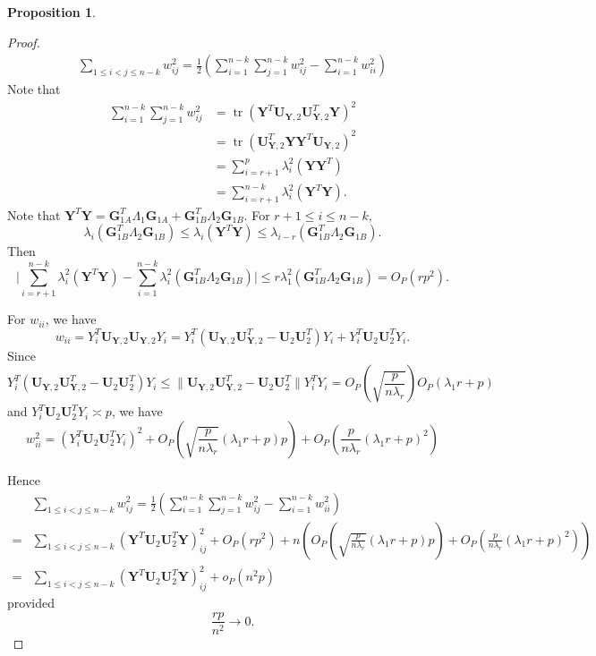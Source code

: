 \documentclass[12pt]{article} %
\DeclareMathOperator{\mytr}{tr}
\newcommand{\bY}{\mathbf{Y}}
\newcommand{\bG}{\mathbf{G}}
\newcommand{\bU}{\mathbf{U}}
\newtheorem{proposition}{Proposition}
\theoremstyle{definition}
\begin{document}
\begin{proposition}

\end{proposition}
\begin{proof}
    $$
    \begin{aligned}
    \sum_{1\leq i < j\leq n-k} w_{ij}^2=
        \frac{1}{2}(\sum_{i=1}^{n-k}\sum_{j=1}^{n-k} w_{ij}^2-\sum_{i=1}^{n-k}w_{ii}^2)
    \end{aligned}
    $$
    Note that
    $$
    \begin{aligned}
\sum_{i=1}^{n-k}\sum_{j=1}^{n-k} w_{ij}^2
        &=\mytr(\bY^T \bU_{\bY,2} \bU_{\bY,2}^T \bY)^2\\
        &=\mytr(\bU_{\bY,2}^T \bY\bY^T \bU_{\bY,2} )^2\\
        &=\sum_{i=r+1}^{p}\lambda_i^2(\bY\bY^T)\\
        &=\sum_{i=r+1}^{n-k}\lambda_i^2(\bY^T\bY).
    \end{aligned}
    $$
    Note that $\bY^T\bY=\bG_{1A}^T \Lambda_1 \bG_{1A}+\bG_{1B}^T \Lambda_2 \bG_{1B}$. For $r+1\leq i\leq n-k$,
    $$
    \lambda_i (\bG_{1B}^T \Lambda_2 \bG_{1B})\leq \lambda_i(\bY^T \bY)\leq \lambda_{i-r}(\bG_{1B}^T \Lambda_2 \bG_{1B}).
    $$
    Then
    $$
    \Big|\sum_{i=r+1}^{n-k}\lambda_i^2(\bY^T \bY)-\sum_{i=1}^{n-k}\lambda_i^2 (\bG_{1B}^T \Lambda_2 \bG_{1B})\Big|\leq
    r\lambda_{1}^2(\bG_{1B}^T \Lambda_2 \bG_{1B})=O_P(r p^2).
    $$

    For $w_{ii}$, we have
    $$
    w_{ii} = Y_i^T \bU_{\bY,2}\bU_{\bY,2}Y_i
     = Y_i^T (\bU_{\bY,2}\bU_{\bY,2}^T-\bU_2 \bU_2^T)Y_i
     + Y_i^T \bU_2 \bU_2^T Y_i.
    $$
Since
$$
      Y_i^T (\bU_{\bY,2}\bU_{\bY,2}^T-\bU_2 \bU_2^T)Y_i\leq
     \|\bU_{\bY,2}\bU_{\bY,2}^T-\bU_2 \bU_2^T\| Y_i^T Y_i=O_P(\sqrt{\frac{p}{n\lambda_r}})O_P(\lambda_1 r+p)
    $$
    and $ Y_i^T \bU_2 \bU_2^T Y_i\asymp p$, we have 
    $$w_{ii}^2=(Y_i^T \bU_2 \bU_2^T Y_i)^2+O_P(\sqrt{\frac{p}{n\lambda_r}}(\lambda_1 r+p)p)+O_P(\frac{p}{n\lambda_r}(\lambda_1 r +p)^2)$$


    Hence
    $$
    \begin{aligned}
        &\sum_{1\leq i < j\leq n-k} w_{ij}^2=
        \frac{1}{2}(\sum_{i=1}^{n-k}\sum_{j=1}^{n-k} w_{ij}^2-\sum_{i=1}^{n-k}w_{ii}^2)\\
        =&
        \sum_{1\leq i < j\leq n-k} (\bY^T \bU_2 \bU_2^T \bY)_{ij}^2
        +O_P(rp^2)+n(O_P(\sqrt{\frac{p}{n\lambda_r}}(\lambda_1 r+p)p)+O_P(\frac{p}{n\lambda_r}(\lambda_1 r +p)^2))\\
        =&
        \sum_{1\leq i < j\leq n-k} (\bY^T \bU_2 \bU_2^T \bY)_{ij}^2
        +o_P(n^2 p)
    \end{aligned}
    $$
    provided
    $$
    \frac{rp}{n^2} \to 0.
    $$

\end{proof}
\end{document}
